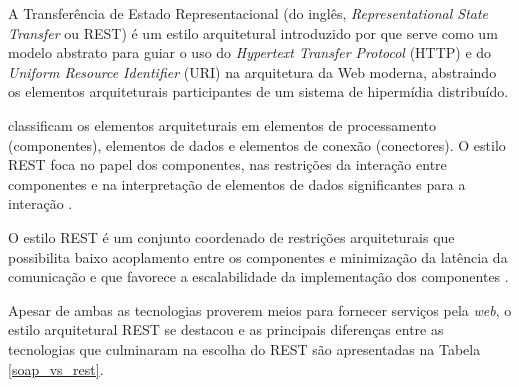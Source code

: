 
A Transferência de Estado Representacional (do inglês, \textit{Representational State Transfer} ou REST)
  é um estilo arquitetural introduzido por  que serve como um modelo abstrato
  para guiar o uso do \textit{Hypertext Transfer Protocol} (HTTP) e do \textit{Uniform Resource Identifier} (URI)
  na arquitetura da Web moderna, abstraindo os elementos arquiteturais participantes de um sistema de
  hipermídia distribuído.
  
   classificam os elementos arquiteturais em elementos de processamento (componentes),
  elementos de dados e elementos de conexão (conectores). O estilo REST foca no papel dos componentes, nas restrições
  da interação entre componentes e na interpretação de elementos de dados significantes para a interação \cite{fielding2002}.
  
  O estilo REST é um conjunto coordenado de restrições arquiteturais que possibilita baixo acoplamento entre os componentes e minimização da latência da comunicação e que favorece a escalabilidade da implementação dos componentes \cite{fielding2002}.
  
   Apesar de ambas as tecnologias proverem meios para fornecer serviços pela \textit{web}, o estilo arquitetural REST se destacou
  e as principais diferenças entre as tecnologias que culminaram na escolha do REST são apresentadas na Tabela \ref{soap_vs_rest}.
  
